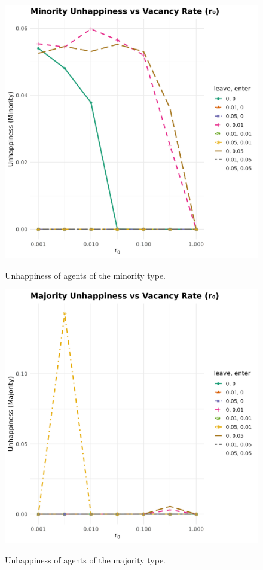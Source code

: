 \begin{figure}[htbp]
    \centering
    \begin{minipage}[t]{0.48\linewidth}
        \centering
        \includegraphics[width=\linewidth]{images/segregation_plot_migration_minority_.png}
        \caption{Unhappiness of agents of the minority type.}
        \label{fig:immigration}
    \end{minipage}
    \hfill
    \begin{minipage}[t]{0.48\linewidth}
        \centering
        \includegraphics[width=\linewidth]{images/segregation_plot_migration_majority_.png}
        \caption{Unhappiness of agents of the majority type.}
        \label{fig:emigration}
    \end{minipage}
    \caption{}
    \label{plt:migration}
\end{figure}
